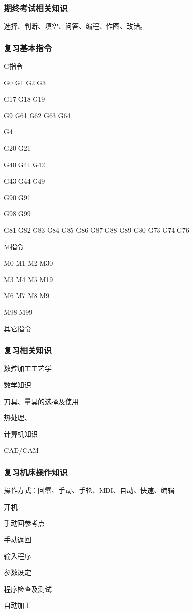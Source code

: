 \subsubsection{期终考试相关知识}
	选择、判断、填空、问答、编程、作图、改错。
\subsubsection{复习基本指令}

	G指令

	G0 G1 G2 G3

	G17 G18 G19

	G9 G61 G62 G63 G64

	G4 

	G20 G21

	G40 G41 G42 

	G43 G44 G49

	G90 G91

	G98 G99

	G81 G82 G83 G84 G85 G86 G87 G88 G89 G80 G73 G74 G76

	M指令

	M0 M1 M2 M30

	M3 M4 M5 M19

	M6 M7 M8 M9

	M98 M99

	其它指令

\subsubsection{复习相关知识}

	数控加工工艺学

	数学知识

	刀具、量具的选择及使用

	热处理、

	计算机知识

	CAD/CAM

\subsubsection{复习机床操作知识}

	操作方式：回零、手动、手轮、MDI、自动、快速、编辑

	开机

	手动回参考点

	手动返回

	输入程序

	参数设定

	程序检查及测试

	自动加工


